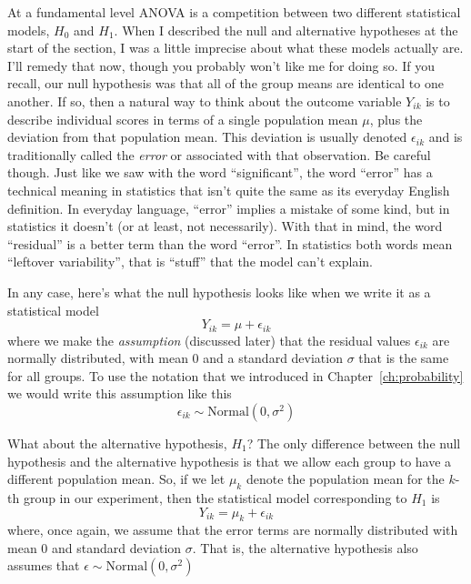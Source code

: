 \vspace{0.5cm}
\begin{mdframed}[style=MyFrame,nobreak=false]

At a fundamental level ANOVA is a competition between two different statistical models, $H_0$ and $H_1$. When I described the null and alternative hypotheses at the start of the section, I was a little imprecise about what these models actually are. I'll remedy that now, though you probably won't like me for doing so. If you recall, our null hypothesis was that all of the group means are identical to one another. If so, then a natural way to think about the outcome variable $Y_{ik}$ is to describe individual scores in terms of a single population mean $\mu$, plus the deviation from that population mean. This deviation is usually denoted $\epsilon_{ik}$ and is traditionally called the {\it error} or  associated with that observation. Be careful though. Just like we saw with the word ``significant'', the word ``error'' has a technical meaning in statistics that isn't quite the same as its everyday English definition. In everyday language, ``error'' implies a mistake of some kind, but in statistics it doesn't (or at least, not necessarily). With that in mind, the word ``residual'' is a better term than the word ``error''. In statistics both words mean ``leftover variability'', that is ``stuff'' that the model can't explain. 

In any case, here's what the null hypothesis looks like when we write it as a statistical model
$$
Y_{ik} = \mu + \epsilon_{ik}
$$
where we make the {\it assumption} (discussed later) that the residual values $\epsilon_{ik}$ are normally distributed, with mean 0 and a standard deviation $\sigma$ that is the same for all groups. To use the notation that we introduced in Chapter~\ref{ch:probability} we would write this assumption like this
$$
\epsilon_{ik} \sim \mbox{Normal}(0, \sigma^2)
$$

What about the alternative hypothesis, $H_1$? The only difference between the null hypothesis and the alternative hypothesis is that we allow each group to have a different population mean. So, if we let $\mu_k$ denote the population mean for the $k$-th group in our experiment, then the statistical model corresponding to $H_1$ is
$$
Y_{ik} = \mu_k + \epsilon_{ik}
$$
where, once again, we assume that the error terms are normally distributed with mean 0 and standard deviation $\sigma$. That is, the alternative hypothesis also assumes that 
$
\epsilon \sim \mbox{Normal}(0, \sigma^2)
$


\end{mdframed}
